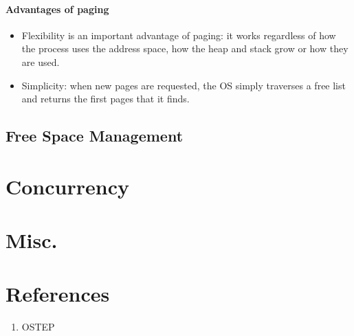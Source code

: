 \documentclass[10pt]{report}
\begin{document}
\subsubsection{Advantages of paging}
\begin{itemize}
    \item Flexibility is an important advantage of paging: it works 
    regardless of how the process uses the address space, how the heap
    and stack grow or how they are used.
    \item Simplicity: when new pages are requested, the OS simply
    traverses a free list and returns the first pages that it finds.
\end{itemize}
\section{Free Space Management}
\chapter{Concurrency}
\chapter{Misc.}
\chapter{References}
\begin{enumerate}
\item OSTEP
\end{enumerate}
\end{document}
